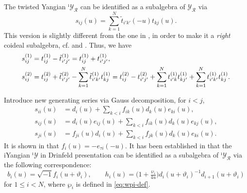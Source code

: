 \documentclass[11pt,reqno]{amsart}
\numberwithin{equation}{section}
\theoremstyle{definition}
\theoremstyle{remark}
\newcommand{\beq}{\begin{equation}}
\newcommand{\eeq}{\end{equation}}
\newcommand{\tl}{\tilde}
\newcommand{\lle}{\leqslant}
\newcommand{\Y}{{\mathscr{Y}}}
\newcommand{\Yi}{{^\imath\mathscr{Y}}}
\begin{document}
The twisted Yangian $\Yi_{\mathscr R}$ can be identified as a subalgebra of $\Y_{\mathscr R}$ via
\beq\label{eq:embed-R}
s_{ij}(u)=\sum_{k=1}^N \tl t_{i'k'}(-u)t_{kj}(u).
\eeq
This version is slightly different from the one in \cite{LZ24}, in order to make it a \textit{right} coideal subalgebra, cf. \cite{LPTTW25} and \cite[Appendix]{Lu26min}. Thus, we have
\begin{align}
  s_{ij}^{(1)}
   &=t_{ij}^{(1)}-\tilde t_{i'j'}^{(1)}
     =t_{ij}^{(1)}+t_{i'j'}^{(1)},\notag\\
  s_{ij}^{(2)}
   &=t_{ij}^{(2)}+\tilde t_{i'j'}^{(2)}
     -\sum_{k=1}^{N}\tilde t_{i'k'}^{(1)}t_{kj}^{(1)}=t_{ij}^{(2)}-t_{i'j'}^{(2)}
     +\sum_{k=1}^{N}t_{i'k}^{(1)}t_{kj'}^{(1)}
     +\sum_{k=1}^{N}t_{i'k'}^{(1)}t_{kj}^{(1)}.
     \label{eq:s-second}
\end{align}

Introduce new generating series via Gauss decomposition, for $i<j$, 
\beq\label{eq:sij-Gauss}
\begin{split}
s_{ii}(u)&=d_i(u)+\sum_{k<i}f_{ik}(u)d_k(u)e_{ki}(u),\\
s_{ij}(u)&=d_i(u)e_{ij}(u)+\sum_{k<i}f_{ik}(u)d_k(u)e_{kj}(u),\\
s_{ji}(u)&=f_{ji}(u)d_i(u)+\sum_{k<i}f_{jk}(u)d_k(u)e_{ki}(u).
\end{split}
\eeq
It is shown in \cite[Lemma~6.8]{LZ24} that $f_i(u)=-e_{\tau i}(-u)$. It has been established in \cite{LZ24} that the iYangian $\Yi$ in Drinfeld presentation can be identified as a subalgebra of $\Yi_{\mathscr R}$ via the following correspondence:
\beq\label{eq:Y2i-R}
b_i(u)=\sqrt{-1}f_i(u+\vartheta_i),\qquad 
h_i(u)=\big(1+\tfrac{\wp_i}{4u}\big) d_{i}(u+\vartheta_i)^{-1}d_{i+1}(u+\vartheta_i)
\eeq
for $1\lle i<N$, where $\wp_i$ is defined in \eqref{eq:wpi-def}.
\end{document}
